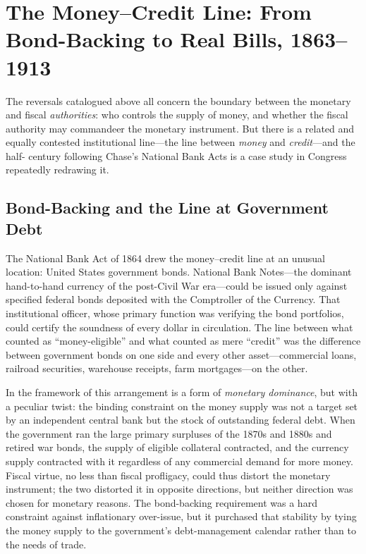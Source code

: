 \documentclass[12pt]{article}
\begin{document}
\section{The Money--Credit Line: From Bond-Backing to Real Bills,
         1863--1913}
\label{sec:money-credit}

The reversals catalogued above all concern the boundary between the
monetary and fiscal \emph{authorities}: who controls the supply of
money, and whether the fiscal authority may commandeer the monetary
instrument.  But there is a related and equally contested institutional
line---the line between \emph{money} and \emph{credit}---and the half-
century following Chase's National Bank Acts is a case study in
Congress repeatedly redrawing it.

\subsection{Bond-Backing and the Line at Government Debt}

The National Bank Act of 1864 drew the money--credit line at an
unusual location: United States government bonds.  National Bank
Notes---the dominant hand-to-hand currency of the post-Civil War
era---could be issued only against specified federal bonds deposited
with the Comptroller of the Currency.  That institutional officer,
whose primary function was verifying the bond portfolios, could
certify the soundness of every dollar in circulation.  The line
between what counted as ``money-eligible'' and what counted as mere
``credit'' was the difference between government bonds on one side and
every other asset---commercial loans, railroad securities, warehouse
receipts, farm mortgages---on the other.

In the framework of \citet{Sargent2011} this arrangement is a form of
\emph{monetary dominance}, but with a peculiar twist: the binding
constraint on the money supply was not a target set by an independent
central bank but the stock of outstanding federal debt.  When the
government ran the large primary surpluses of the 1870s and 1880s and
retired war bonds, the supply of eligible collateral contracted, and
the currency supply contracted with it regardless of any commercial
demand for more money.  Fiscal virtue, no less than fiscal profligacy,
could thus distort the monetary instrument; the two distorted it in
opposite directions, but neither direction was chosen for monetary
reasons.  The bond-backing requirement was a hard constraint against
inflationary over-issue, but it purchased that stability by tying the
money supply to the government's debt-management calendar rather than
to the needs of trade.
\end{document}
